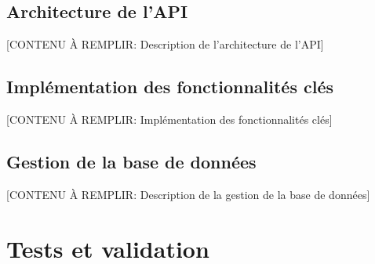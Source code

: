 
\subsection{Architecture de l'API}

[CONTENU À REMPLIR: Description de l'architecture de l'API]


\subsection{Implémentation des fonctionnalités clés}


[CONTENU À REMPLIR: Implémentation des fonctionnalités clés]


\subsection{Gestion de la base de données}

[CONTENU À REMPLIR: Description de la gestion de la base de données]


\section{Tests et validation}

